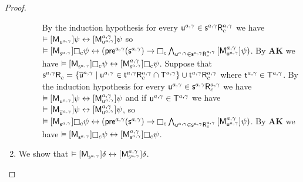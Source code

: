 \begin{proof}
\begin{enumerate}
\begin{description}
                By the induction hypothesis for every $\aStateU[\agentA, \gamma] \in \aSuccessorsC[\agentA, \gamma]{\aStateS[\agentA, \gamma]}$ we have $\entails \actionA{\aPModel{\aStateU[\agentA, \gamma]}} \psi \iff \actionA{\aPModel[\agentA, \gamma]{\aStateU[\agentA, \gamma]}} \psi$ so $\entails \actionA{\aPModel{\aStateS[\agentA, \gamma]}} \necessaryC \psi \iff (\aPrecondition[\agentA, \gamma](\aStateS[\agentA, \gamma]) \implies \necessaryC \bigwedge_{\aStateU[\agentA, \gamma] \in \aSuccessorsC[\agentA, \gamma]{\aStateS[\agentA, \gamma]}} \actionA{\aPModel[\agentA, \gamma]{\aStateU[\agentA, \gamma]}} \psi)$.
                By {\bf AK} we have $\entails \actionA{\aPModel{\aStateS[\agentA, \gamma]}} \necessaryC \psi \iff \actionA{\aPModel[\agentA, \gamma]{\aStateS[\agentA, \gamma]}} \necessaryC \psi$.
                Suppose that $\aSuccessorsC{\aStateS[\agentA, \gamma]} = \{\aPStateU[\agentA, \gamma] \mid \aStateU[\agentA, \gamma] \in \aSuccessorsC[\agentA, \gamma]{\aStateT[\agentA, \gamma]} \cap \aStatesT[\agentA, \gamma]\} \cup \aSuccessorsC[\agentA, \gamma]{\aStateT[\agentA, \gamma]}$ where $\aStateT[\agentA, \gamma] \in \aStatesT[\agentA, \gamma]$.
                By the induction hypothesis for every $\aStateU[\agentA, \gamma] \in \aSuccessorsC[\agentA, \gamma]{\aStateS[\agentA, \gamma]}$ we have $\entails \actionA{\aPModel{\aStateU[\agentA, \gamma]}} \psi \iff \actionA{\aPModel[\agentA, \gamma]{\aStateU[\agentA, \gamma]}} \psi$ and if $\aStateU[\agentA, \gamma] \in \aStatesT[\agentA, \gamma]$ we have $\entails \actionA{\aPModel{\aPStateU[\agentA, \gamma]}} \psi \iff \actionA{\aPModel[\agentA, \gamma]{\aStateU[\agentA, \gamma]}} \psi$, so $\entails \actionA{\aPModel{\aStateS[\agentA, \gamma]}} \necessaryC \psi \iff (\aPrecondition[\agentA, \gamma](\aStateS[\agentA, \gamma]) \implies \necessaryC \bigwedge_{\aStateU[\agentA, \gamma] \in \aSuccessorsC[\agentA, \gamma]{\aStateS[\agentA, \gamma]}} \actionA{\aPModel[\agentA, \gamma]{\aStateU[\agentA, \gamma]}} \psi)$.
                By {\bf AK} we have $\entails \actionA{\aPModel{\aStateS[\agentA, \gamma]}} \necessaryC \psi \iff \actionA{\aPModel[\agentA, \gamma]{\aStateS[\agentA, \gamma]}} \necessaryC \psi$.
        \end{description}
    \item We show that $\entails \actionA{\aPModel{\aStateS[\agentA, \gamma]}} \delta \iff \actionA{\aPModel[\agentA, \gamma]{\aStateS[\agentA, \gamma]}} \delta$.


\end{enumerate}
\end{proof}
